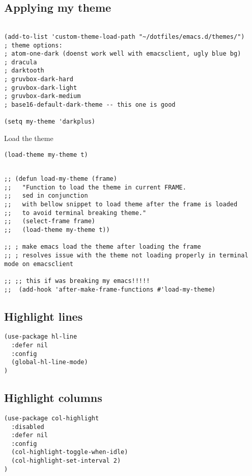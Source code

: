 \documentclass[11pt]{article}
\begin{document}
\subsection*{Applying my theme}
\label{sec:orge409b55}

\begin{verbatim}

(add-to-list 'custom-theme-load-path "~/dotfiles/emacs.d/themes/")
; theme options:
; atom-one-dark (doenst work well with emacsclient, ugly blue bg)
; dracula
; darktooth
; gruvbox-dark-hard
; gruvbox-dark-light
; gruvbox-dark-medium
; base16-default-dark-theme -- this one is good

(setq my-theme 'darkplus)

\end{verbatim}

Load the theme

\begin{verbatim}
(load-theme my-theme t)
\end{verbatim}


\begin{verbatim}

;; (defun load-my-theme (frame)
;;   "Function to load the theme in current FRAME.
;;   sed in conjunction
;;   with bellow snippet to load theme after the frame is loaded
;;   to avoid terminal breaking theme."
;;   (select-frame frame)
;;   (load-theme my-theme t))

;; ; make emacs load the theme after loading the frame
;; ; resolves issue with the theme not loading properly in terminal mode on emacsclient

;; ;; this if was breaking my emacs!!!!!
;;  (add-hook 'after-make-frame-functions #'load-my-theme)
\end{verbatim}


\subsection*{Highlight lines}
\label{sec:orgbc45f3d}

\begin{verbatim}
(use-package hl-line
  :defer nil
  :config
  (global-hl-line-mode)
)
\end{verbatim}

\subsection*{Highlight columns}
\label{sec:org48f43be}

\begin{verbatim}
(use-package col-highlight
  :disabled
  :defer nil
  :config
  (col-highlight-toggle-when-idle)
  (col-highlight-set-interval 2)
)
\end{verbatim}
\end{document}
